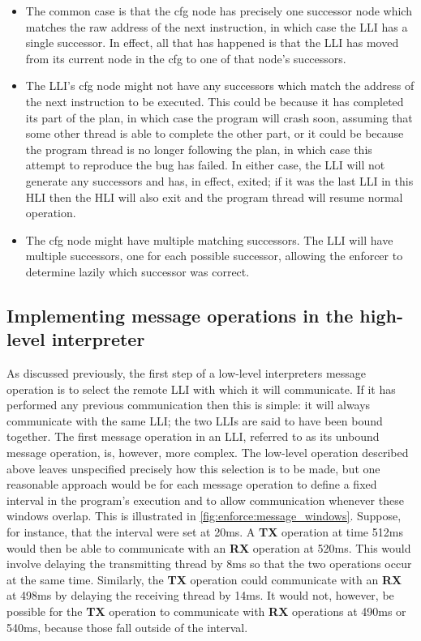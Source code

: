 \begin{itemize}
\item The common case is that the \gls{cfg} node has precisely one
  successor node which matches the raw address of the next
  instruction, in which case the LLI has a single successor.  In
  effect, all that has happened is that the LLI has moved from its
  current node in the \gls{cfg} to one of that node's successors.

\item The LLI's \gls{cfg} node might not have any successors which
  match the address of the next instruction to be executed.  This
  could be because it has completed its part of the plan, in which
  case the program will crash soon, assuming that some other thread is
  able to complete the other part, or it could be because the program
  thread is no longer following the plan, in which case this attempt
  to reproduce the bug has failed.  In either case, the LLI will not
  generate any successors and has, in effect, exited; if it was the
  last LLI in this HLI then the HLI will also exit and the program
  thread will resume normal operation.

\item The \gls{cfg} node might have multiple matching successors.  The LLI
  will have multiple successors, one for each possible successor,
  allowing the enforcer to determine lazily which successor was
  correct.
\end{itemize}

\subsection{Implementing message operations in the high-level interpreter}
\label{sect:enforce:hli_messages}

As discussed previously, the first step of a low-level interpreters
message operation is to select the remote LLI with which it will
communicate.  If it has performed any previous communication then this
is simple: it will always communicate with the same LLI; the two LLIs
are said to have been bound together.  The first message operation in
an LLI, referred to as its unbound message operation, is, however,
more complex.  The low-level operation described above leaves
unspecified precisely how this selection is to be made, but one
reasonable approach would be for each message operation to define a
fixed interval in the program's execution and to allow communication
whenever these windows overlap.  This is illustrated in
\autoref{fig:enforce:message_windows}.  Suppose, for instance, that
the interval were set at 20ms.  A \textbf{TX} operation at time 512ms
would then be able to communicate with an \textbf{RX} operation at
520ms.  This would involve delaying the transmitting thread by 8ms so
that the two operations occur at the same time.  Similarly, the
\textbf{TX} operation could communicate with an \textbf{RX} at 498ms
by delaying the receiving thread by 14ms.  It would not, however, be
possible for the \textbf{TX} operation to communicate with \textbf{RX}
operations at 490ms or 540ms, because those fall outside of the
interval.

